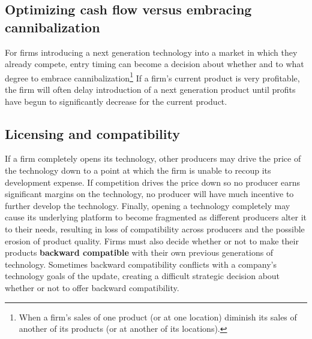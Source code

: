 \documentclass[12pt]{article}
\begin{document}
\subsection{Optimizing cash flow versus embracing cannibalization}
For firms introducing a next generation technology into a market in which they
already compete, entry timing can become a decision about whether and to what
degree to embrace cannibalization\footnote{When a firm's sales of one product (or at one location) diminish its sales
of another of its products (or at another of its locations).}
If a firm's current product is very profitable, the firm will often delay introduction of a next generation product until profits have begun to significantly decrease for the current product.

\subsection{Licensing and compatibility}
If a firm completely opens its technology, other producers may drive the price of the technology down to a point at which the firm is unable to recoup its development expense.
If competition drives the price down so no producer earns significant margins
on the technology, no producer will have much incentive to further develop the technology. Finally, opening a technology completely may cause its underlying platform to
become fragmented as different producers alter it to their needs, resulting in loss of
compatibility across producers and the possible erosion of product quality.
Firms must also decide whether or not to make their products \textbf{backward compatible} with their own previous generations of technology.
Sometimes backward compatibility conflicts with a company's technology goals
of the update, creating a difficult strategic decision about whether or not to offer backward compatibility.
\end{document}
